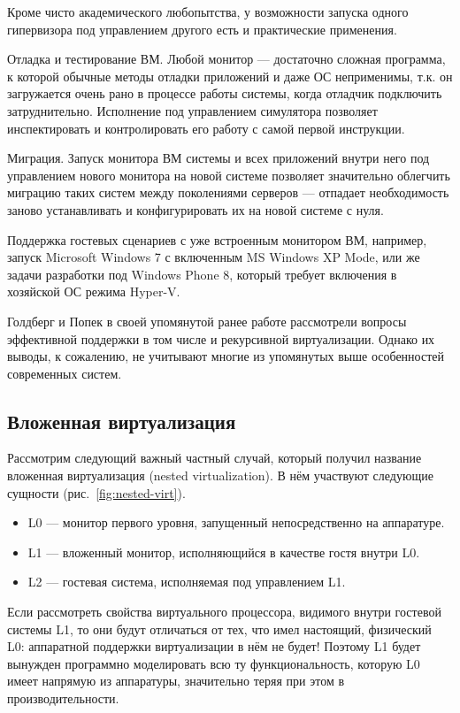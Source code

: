 Кроме чисто академического любопытства, у возможности запуска одного гипервизора под управлением другого есть и практические применения.

\begin{itemize*}
    \item Отладка и тестирование ВМ. Любой монитор — достаточно сложная программа, к которой обычные методы отладки приложений и даже ОС неприменимы, т.к. он загружается очень рано в процессе работы системы, когда отладчик подключить затруднительно. Исполнение под управлением симулятора позволяет инспектировать и контролировать его работу с самой первой инструкции.
    \item Миграция. Запуск монитора ВМ системы и всех приложений внутри него под управлением нового монитора на новой системе позволяет значительно облегчить миграцию таких систем между поколениями серверов — отпадает необходимость заново устанавливать и конфигурировать их на новой системе с нуля.
    \item Поддержка гостевых сценариев с уже встроенным монитором ВМ, например, запуск Microsoft Windows 7 с включенным MS Windows XP Mode, или же задачи разработки под Windows Phone 8, который требует включения в хозяйской ОС режима Hyper-V.
\end{itemize*}

Голдберг и Попек в своей упомянутой ранее работе рассмотрели вопросы эффективной поддержки в том числе и рекурсивной виртуализации. Однако их выводы, к сожалению, не учитывают многие из упомянутых выше особенностей современных систем.

\subsection{Вложенная виртуализация}

Рассмотрим следующий важный частный случай, который получил название вложенная виртуализация (\abbr nested virtualization). В нём участвуют следующие сущности (рис.~\ref{fig:nested-virt}).

\begin{itemize}
\item L0 — монитор первого уровня, запущенный непосредственно на аппаратуре.
\item L1 — вложенный монитор, исполняющийся в качестве гостя внутри L0.
\item L2 — гостевая система, исполняемая под управлением L1.
\end{itemize}

Если рассмотреть свойства виртуального процессора, видимого внутри гостевой системы L1, то они будут отличаться от тех, что имел настоящий, физический L0: аппаратной поддержки виртуализации в нём не будет! Поэтому L1 будет вынужден программно моделировать всю ту функциональность, которую L0 имеет напрямую из аппаратуры, значительно теряя при этом в производительности.

